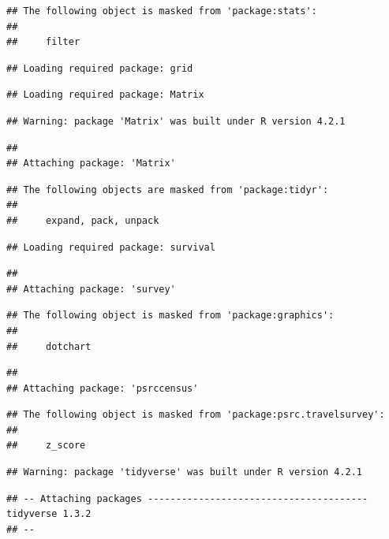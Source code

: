 \documentclass[
  12pt,
]{article}
\begin{document}
\begin{verbatim}
## The following object is masked from 'package:stats':
## 
##     filter
\end{verbatim}

\begin{verbatim}
## Loading required package: grid
\end{verbatim}

\begin{verbatim}
## Loading required package: Matrix
\end{verbatim}

\begin{verbatim}
## Warning: package 'Matrix' was built under R version 4.2.1
\end{verbatim}

\begin{verbatim}
## 
## Attaching package: 'Matrix'
\end{verbatim}

\begin{verbatim}
## The following objects are masked from 'package:tidyr':
## 
##     expand, pack, unpack
\end{verbatim}

\begin{verbatim}
## Loading required package: survival
\end{verbatim}

\begin{verbatim}
## 
## Attaching package: 'survey'
\end{verbatim}

\begin{verbatim}
## The following object is masked from 'package:graphics':
## 
##     dotchart
\end{verbatim}

\begin{verbatim}
## 
## Attaching package: 'psrccensus'
\end{verbatim}

\begin{verbatim}
## The following object is masked from 'package:psrc.travelsurvey':
## 
##     z_score
\end{verbatim}

\begin{verbatim}
## Warning: package 'tidyverse' was built under R version 4.2.1
\end{verbatim}

\begin{verbatim}
## -- Attaching packages --------------------------------------- tidyverse 1.3.2
## --
\end{verbatim}
\end{document}
